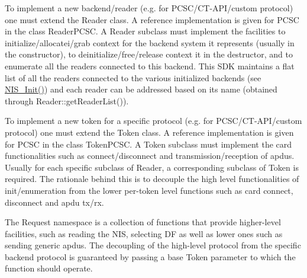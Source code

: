 To implement a new backend/reader (e.\-g. for P\-C\-S\-C/\-C\-T-\/\-A\-P\-I/custom protocol) one must extend the Reader class. A reference implementation is given for P\-C\-S\-C in the class Reader\-P\-C\-S\-C. A Reader subclass must implement the facilities to initialize/allocatei/grab context for the backend system it represents (usually in the constructor), to deinitialize/free/release context it in the destructor, and to enumerate all the readers connected to this backend. This S\-D\-K maintains a flat list of all the readers connected to the various initialized backends (see \hyperlink{nis_8cpp_a1a4da622cc9443c4fc71b276454923da}{N\-I\-S\-\_\-\-Init()}) and each reader can be addressed based on its name (obtained through Reader\-::get\-Reader\-List()).

To implement a new token for a specific protocol (e.\-g. for P\-C\-S\-C/\-C\-T-\/\-A\-P\-I/custom protocol) one must extend the Token class. A reference implementation is given for P\-C\-S\-C in the class Token\-P\-C\-S\-C. A Token subclass must implement the card functionalities such as connect/disconnect and transmission/reception of apdus. Usually for each specific subclass of Reader, a corresponding subclass of Token is required. The rationale behind this is to decouple the high level functionalities of init/enumeration from the lower per-\/token level functions such as card connect, disconnect and apdu tx/rx.

The Request namespace is a collection of functions that provide higher-\/level facilities, such as reading the N\-I\-S, selecting D\-F as well as lower ones such as sending generic apdus. The decoupling of the high-\/level protocol from the specific backend protocol is guaranteed by passing a base Token parameter to which the function should operate. 